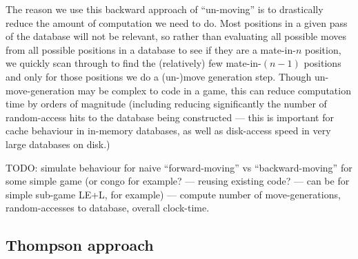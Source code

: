 \documentclass[10pt,dvipdfmx]{report}
\begin{document}
The reason we use this backward approach of ``un-moving'' is to drastically reduce the amount
of computation we need to do.  Most positions in a given pass of the database will not be relevant,
so rather than evaluating all possible moves from all possible positions in a database to see
if they are a mate-in-$n$ position, we quickly scan through to find the (relatively) few
mate-in-$(n-1)$ positions and only for those positions we do a (un-)move generation step.
Though un-move-generation may be complex to code in a game, this can reduce computation time by
orders of magnitude (including reducing significantly the number of random-access hits to the
database being constructed --- this is important for cache behaviour in in-memory databases, as well
as disk-access speed in very large databases on disk.)

TODO:
simulate behaviour for naive ``forward-moving'' vs ``backward-moving'' for some simple game
(or congo for example? --- reusing existing code? --- can be for simple sub-game
LE+L, for example)
--- compute number of move-generations, random-accesses to database, overall clock-time.

\subsection{Thompson approach}
\end{document}
